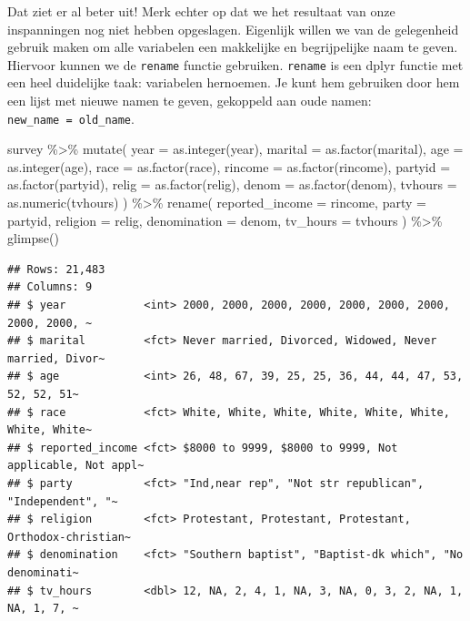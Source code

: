 \documentclass[]{tufte-book}
\newenvironment{Shaded}{}{}
\newcommand{\AttributeTok}[1]{\textcolor[rgb]{0.49,0.56,0.16}{#1}}
\newcommand{\FunctionTok}[1]{\textcolor[rgb]{0.02,0.16,0.49}{#1}}
\newcommand{\NormalTok}[1]{#1}
\newcommand{\SpecialCharTok}[1]{\textcolor[rgb]{0.25,0.44,0.63}{#1}}
\begin{document}
Dat ziet er al beter uit! Merk echter op dat we het resultaat van onze inspanningen nog niet hebben opgeslagen. Eigenlijk willen we van de gelegenheid gebruik maken om alle variabelen een makkelijke en begrijpelijke naam te geven. Hiervoor kunnen we de \texttt{rename} functie gebruiken. \texttt{rename} is een dplyr functie met een heel duidelijke taak: variabelen hernoemen. Je kunt hem gebruiken door hem een lijst met nieuwe namen te geven, gekoppeld aan oude namen: \texttt{new\_name\ =\ old\_name}.

\begin{Shaded}
\begin{Highlighting}[]
\NormalTok{survey }\SpecialCharTok{\%\textgreater{}\%}
  \FunctionTok{mutate}\NormalTok{(}
    \AttributeTok{year =} \FunctionTok{as.integer}\NormalTok{(year),}
    \AttributeTok{marital =} \FunctionTok{as.factor}\NormalTok{(marital),}
    \AttributeTok{age =} \FunctionTok{as.integer}\NormalTok{(age),}
    \AttributeTok{race =} \FunctionTok{as.factor}\NormalTok{(race),}
    \AttributeTok{rincome =} \FunctionTok{as.factor}\NormalTok{(rincome),}
    \AttributeTok{partyid =} \FunctionTok{as.factor}\NormalTok{(partyid),}
    \AttributeTok{relig =} \FunctionTok{as.factor}\NormalTok{(relig),}
    \AttributeTok{denom =} \FunctionTok{as.factor}\NormalTok{(denom),}
    \AttributeTok{tvhours =} \FunctionTok{as.numeric}\NormalTok{(tvhours)}
\NormalTok{  ) }\SpecialCharTok{\%\textgreater{}\%}
  \FunctionTok{rename}\NormalTok{(}
    \AttributeTok{reported\_income =}\NormalTok{ rincome,}
    \AttributeTok{party =}\NormalTok{ partyid,}
    \AttributeTok{religion =}\NormalTok{ relig,}
    \AttributeTok{denomination =}\NormalTok{ denom,}
    \AttributeTok{tv\_hours =}\NormalTok{ tvhours}
\NormalTok{  ) }\SpecialCharTok{\%\textgreater{}\%}
  \FunctionTok{glimpse}\NormalTok{()}
\end{Highlighting}
\end{Shaded}

\begin{verbatim}
## Rows: 21,483
## Columns: 9
## $ year            <int> 2000, 2000, 2000, 2000, 2000, 2000, 2000, 2000, 2000, ~
## $ marital         <fct> Never married, Divorced, Widowed, Never married, Divor~
## $ age             <int> 26, 48, 67, 39, 25, 25, 36, 44, 44, 47, 53, 52, 52, 51~
## $ race            <fct> White, White, White, White, White, White, White, White~
## $ reported_income <fct> $8000 to 9999, $8000 to 9999, Not applicable, Not appl~
## $ party           <fct> "Ind,near rep", "Not str republican", "Independent", "~
## $ religion        <fct> Protestant, Protestant, Protestant, Orthodox-christian~
## $ denomination    <fct> "Southern baptist", "Baptist-dk which", "No denominati~
## $ tv_hours        <dbl> 12, NA, 2, 4, 1, NA, 3, NA, 0, 3, 2, NA, 1, NA, 1, 7, ~
\end{verbatim}
\end{document}
